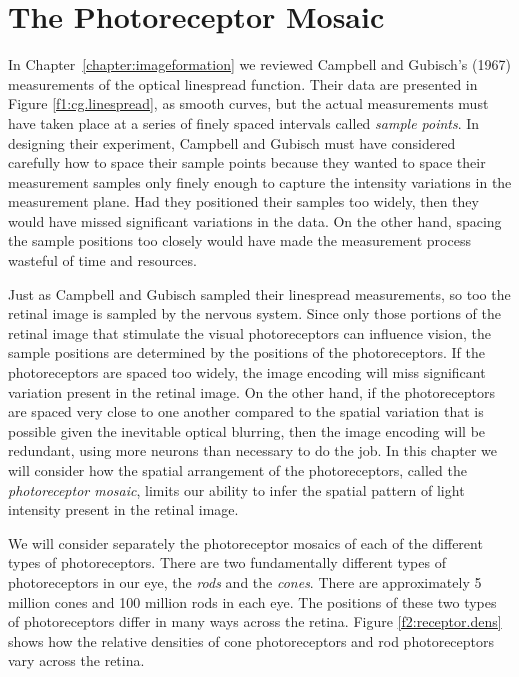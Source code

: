 %
%
\chapter{The Photoreceptor Mosaic}
\label{chapter:mosaic}

In Chapter~\ref{chapter:imageformation}
we reviewed Campbell and Gubisch's (1967) measurements of
the optical linespread function.
Their data are presented in Figure \ref{f1:cg.linespread},
as smooth curves, but the actual measurements
must have taken place at a series of finely spaced intervals
called {\em sample points}.
In designing their experiment, Campbell and Gubisch
must have considered carefully how to space their sample points
because they wanted to space their measurement samples only
finely enough to capture the
intensity variations in the measurement plane.
Had they positioned their samples too widely, then
they would have missed significant variations in the data.
On the other hand, spacing the
sample positions too closely would have made
the measurement process wasteful of time and resources.

Just as Campbell and Gubisch sampled their linespread measurements,
so too the retinal image is sampled by the nervous system.
Since only those portions of the retinal image that
stimulate the visual photoreceptors can influence vision,
the sample positions are determined by the positions of
the photoreceptors.
If the photoreceptors are spaced too widely, 
the image encoding will miss significant variation
present in the retinal image.
On the other hand, if the photoreceptors
are spaced very close to one another
compared to the spatial variation
that is possible given the inevitable optical blurring,
then the image encoding will be redundant,
using more neurons than necessary to do the job.
In this chapter we will consider
how the spatial arrangement of the photoreceptors,
called the {\em photoreceptor mosaic},
limits our ability to infer the spatial pattern of 
light intensity present in the retinal image.

We will consider separately the photoreceptor mosaics of each
of the different types of photoreceptors.
There are two fundamentally different types of photoreceptors
in our eye, the {\em rods} and the {\em cones}.
There are approximately 5 million cones
and 100 million rods in each eye.
The positions of these two types of photoreceptors differ
in many ways across the retina.
Figure \ref{f2:receptor.dens}
shows how the relative densities of cone photoreceptors
and rod photoreceptors vary across the retina.

